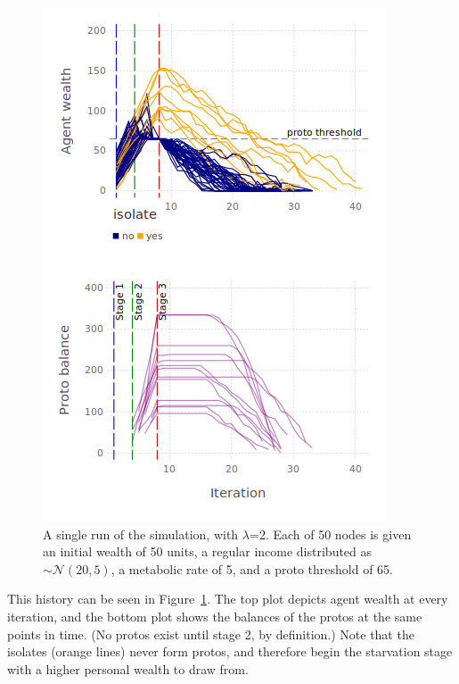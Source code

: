 \begin{figure}[ht]
\centering
\includegraphics[width=\columnwidth]{figures/sampleLifeHistory.png}
\caption{A single run of the simulation, with $\lambda$=2. Each of 50 nodes is
given an initial wealth of 50 units, a regular income distributed as
$\sim\mathcal{N}(20,5)$, a metabolic rate of 5, and a proto threshold of 65.}
\label{fig:singleRun}
\end{figure}

This history can be seen in Figure~\ref{fig:singleRun}. The top plot depicts
agent wealth at every iteration, and the bottom plot shows the balances of the
protos at the same points in time. (No protos exist until stage 2, by
definition.) Note that the isolates (orange lines) never form protos, and
therefore begin the starvation stage with a higher personal wealth to draw
from.



